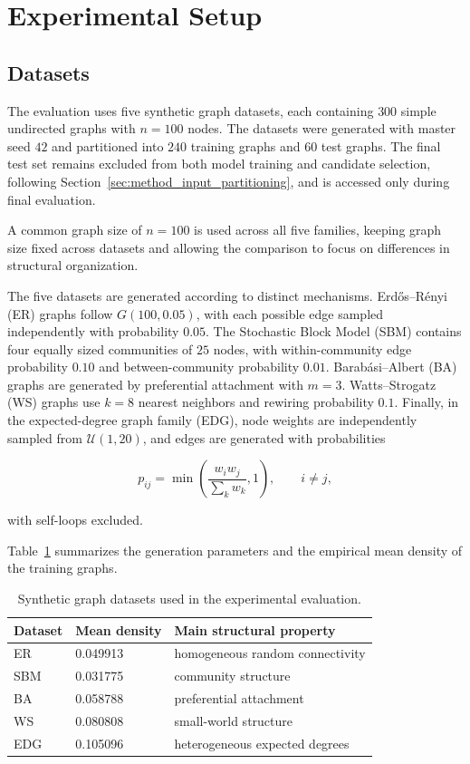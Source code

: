 \section{Experimental Setup}
\label{sec:exp_setup}

\subsection{Datasets}
\label{subsec:exp_datasets}

The evaluation uses five synthetic graph datasets, each containing \(300\) simple undirected graphs with \(n=100\) nodes.
The datasets were generated with master seed \(42\) and partitioned into \(240\) training graphs and \(60\) test graphs.
The final test set remains excluded from both model training and candidate selection, following Section~\ref{sec:method_input_partitioning}, and is accessed only during final evaluation.

A common graph size of \(n=100\) is used across all five families, keeping graph size fixed across datasets and allowing the comparison to focus on differences in structural organization.

The five datasets are generated according to distinct mechanisms.
Erd\H{o}s--R\'enyi (ER) graphs follow \(G(100,0.05)\), with each possible edge sampled independently with probability \(0.05\).
The Stochastic Block Model (SBM) contains four equally sized communities of \(25\) nodes, with within-community edge probability \(0.10\) and between-community probability \(0.01\).
Barab\'asi--Albert (BA) graphs are generated by preferential attachment with \(m=3\).
Watts--Strogatz (WS) graphs use \(k=8\) nearest neighbors and rewiring probability \(0.1\).
Finally, in the expected-degree graph family (EDG), node weights are independently sampled from \(\mathcal{U}(1,20)\), and edges are generated with probabilities

\[
p_{ij}
=
\min\left(
\frac{w_i w_j}{\sum_k w_k},
1
\right),
\qquad i \neq j,
\]

with self-loops excluded.

Table~\ref{tab:exp_datasets} summarizes the generation parameters and the empirical mean density of the training graphs.
\begin{table}[H]
    \centering
    \caption{Synthetic graph datasets used in the experimental evaluation.}
    \label{tab:exp_datasets}
    \begin{tabularx}{\textwidth}{l l l}
        \hline
        Dataset & Mean density & Main structural property \\
        \hline
        ER  & 0.049913 & homogeneous random connectivity \\
        SBM & 0.031775 & community structure \\
        BA  & 0.058788 & preferential attachment \\
        WS  & 0.080808 & small-world structure \\
        EDG & 0.105096 & heterogeneous expected degrees \\
        \hline
    \end{tabularx}
\end{table}

